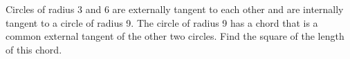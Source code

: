 Circles of radius 3 and 6 are externally tangent to each other and are internally tangent to a circle of radius 9. The circle of radius 9 has a chord that is a common external tangent of the other two circles. Find the square of the length of this chord.